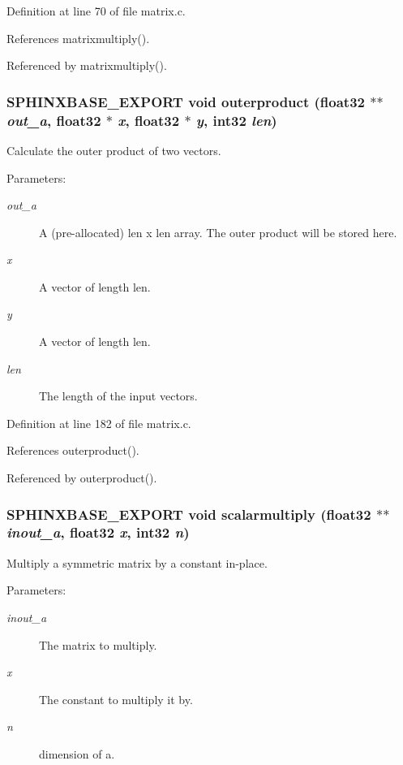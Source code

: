 Definition at line 70 of file matrix.c.

References matrixmultiply().

Referenced by matrixmultiply().
\subsubsection[{outerproduct}]{\setlength{\rightskip}{0pt plus 5cm}SPHINXBASE\_\-EXPORT void outerproduct (float32 $\ast$$\ast$ {\em out\_\-a}, \/  float32 $\ast$ {\em x}, \/  float32 $\ast$ {\em y}, \/  int32 {\em len})}\label{matrix_8h_a2d31d63ec277fd389d4ef51d3b2bc2b}


Calculate the outer product of two vectors. 

\begin{Desc}
\item[Parameters:]
\begin{description}
\item[{\em out\_\-a}]A (pre-allocated) len x len array. The outer product will be stored here. \item[{\em x}]A vector of length len. \item[{\em y}]A vector of length len. \item[{\em len}]The length of the input vectors. \end{description}
\end{Desc}


Definition at line 182 of file matrix.c.

References outerproduct().

Referenced by outerproduct().
\subsubsection[{scalarmultiply}]{\setlength{\rightskip}{0pt plus 5cm}SPHINXBASE\_\-EXPORT void scalarmultiply (float32 $\ast$$\ast$ {\em inout\_\-a}, \/  float32 {\em x}, \/  int32 {\em n})}\label{matrix_8h_dc8ee5f4e4792328e4f33309bc99ebfb}


Multiply a symmetric matrix by a constant in-place. 

\begin{Desc}
\item[Parameters:]
\begin{description}
\item[{\em inout\_\-a}]The matrix to multiply. \item[{\em x}]The constant to multiply it by. \item[{\em n}]dimension of a. \end{description}
\end{Desc}


